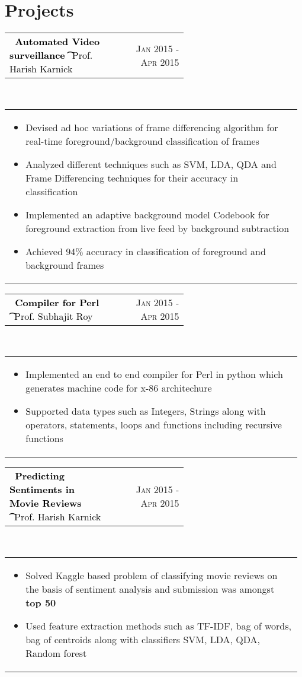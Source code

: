 \documentclass[a4paper]{article} %
\newcommand{\verticalspacing}{-0.55cm}
\newcommand{\bulletspace}{0.7cm}
\newcommand{\projectheadspacing}{6.9cm}
\newcommand{\aproject}[5]{%
    \begin{tabular}{p{0.60\linewidth} r}
        \textcolor{Black}{\textbf{\large\ #2 \t }\small\ #3 } & \multicolumn{1}{m{ \projectheadspacing{} }}{\raggedleft \small {\textsc{#1}}}\\
    \end{tabular}\\
    \begin{tabular}{p{0.98\linewidth}}
    \vspace{-0.1cm}
        \small{#5}
    \end{tabular}
    \vspace{\verticalspacing{}}
}
\begin{document}

\vspace{-0.4cm}
\section{Projects}

\aproject
    {Jan 2015 - Apr 2015 }
    {Automated Video surveillance}
    {Prof. Harish Karnick}
    {}
    {%
        \vspace{-0.3cm}
        \begin{itemize}[itemsep = -0.8mm,leftmargin=\bulletspace{}]
            \item Devised ad hoc variations of frame differencing algorithm for real-time foreground/background classification of frames
            \item  Analyzed different techniques such as SVM, LDA, QDA and Frame Differencing techniques for their accuracy in classification
            \item Implemented an adaptive background model Codebook for foreground extraction from live feed by background subtraction
            \item Achieved 94\% accuracy in classification of foreground and background frames

        \end{itemize}
    }

\aproject
    {Jan 2015 - Apr 2015}
    {Compiler for Perl}
    {Prof. Subhajit Roy}
    {}
    {%
        \vspace{-0.3cm}
        \begin{itemize}[itemsep = -0.8mm,leftmargin=\bulletspace{}]
            \item Implemented an end to end compiler for Perl in python which generates machine code for x-86 architechure
            \item Supported data types such as Integers, Strings along with operators, statements, loops and functions including recursive functions
        \end{itemize}
    }

\aproject
    {Jan 2015 - Apr 2015}
    {Predicting Sentiments in Movie Reviews}
    {Prof. Harish Karnick}
    {}
    {%
        \vspace{-0.3cm}
        \begin{itemize}[itemsep = -0.8mm,leftmargin=\bulletspace{}]
            \item Solved Kaggle based problem of classifying movie reviews on the basis of sentiment analysis and submission was amongst \textbf{top 50}
            \item Used feature extraction methods such as TF-IDF, bag of words, bag of centroids along with classifiers SVM, LDA, QDA, Random forest
            
        \end{itemize}
    }
\end{document}

